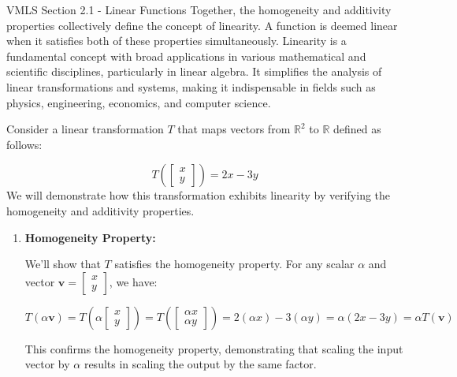 \begin{notes}{VMLS Section 2.1 - Linear Functions}
    Together, the homogeneity and additivity properties collectively define the concept of linearity. A function is deemed linear when it satisfies both of these properties simultaneously. Linearity is a fundamental 
    concept with broad applications in various mathematical and scientific disciplines, particularly in linear algebra. It simplifies the analysis of linear transformations and systems, making it indispensable in fields 
    such as physics, engineering, economics, and computer science.

    \begin{highlight}
        Consider a linear transformation \(T\) that maps vectors from \(\mathbb{R}^2\) to \(\mathbb{R}\) defined as follows:
        
        \begin{equation*}
            T\left(\begin{bmatrix} x \\ y \end{bmatrix}\right) = 2x - 3y
        \end{equation*}
        We will demonstrate how this transformation exhibits linearity by verifying the homogeneity and additivity properties.
        
        \begin{enumerate}
            \item \textbf{Homogeneity Property:}
            
            We'll show that \(T\) satisfies the homogeneity property. For any scalar \(\alpha\) and vector \(\mathbf{v} = \begin{bmatrix} x \\ y \end{bmatrix}\), we have:
            
            \[
            T(\alpha\mathbf{v}) = T\left(\alpha\begin{bmatrix} x \\ y \end{bmatrix}\right) = T\left(\begin{bmatrix} \alpha x \\ \alpha y \end{bmatrix}\right) = 2(\alpha x) - 3(\alpha y) = \alpha(2x - 3y) = \alpha T(\mathbf{v})
            \]
            
            This confirms the homogeneity property, demonstrating that scaling the input vector by \(\alpha\) results in scaling the output by the same factor.
            

\end{enumerate}
\end{highlight}
\end{notes}
